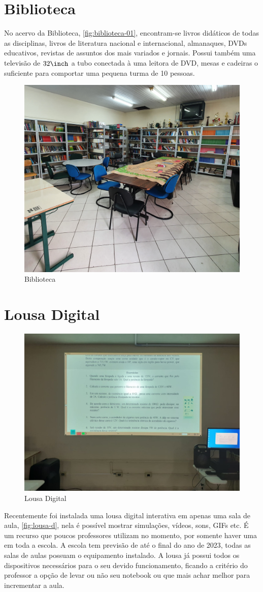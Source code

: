 \section{Biblioteca} %
\label{sec:Biblioteca}
No acervo da Biblioteca, \autoref{fig:biblioteca-01}, encontram-se livros didáticos de todas as disciplinas, livros de literatura nacional e internacional, almanaques, \acp{DVD} educativos, revistas de assuntos dos mais variados e jornais. Possui também uma televisão de $32\inch$ a tubo conectada à uma leitora de \ac{DVD}, mesas e cadeiras o suficiente para comportar uma pequena turma de 10 pessoas.
\vspace{10pt}

\begin{figure}[ht!]
	\centering
	\includegraphics[width=.7\linewidth]{assets/biblioteca-01.jpg}
	\caption{Biblioteca}
	\label{fig:biblioteca-01}
\end{figure}

\section{Lousa Digital} %
\label{sec:Lousa Digital}
\setlength\intextsep{0pt}
\begin{figure}
	\centering
	\includegraphics[width=.4\textwidth]{assets/d-lousa.jpeg}
	\caption{Lousa Digital}
	\label{fig:lousa-d}
\end{figure}
Recentemente foi instalada uma lousa digital interativa em apenas uma sala de aula, \autoref{fig:lousa-d}, nela é possível mostrar simulações, vídeos, sons, GIFs etc. É um recurso que poucos professores utilizam no momento, por somente haver uma em toda a escola. A escola tem previsão de até o final do ano de 2023, todas as salas de aulas possuam o equipamento instalado. A lousa já possui todos os dispositivos necessários para o seu devido funcionamento, ficando a critério do professor a opção de levar ou não seu notebook ou que mais achar melhor para incrementar a aula.

